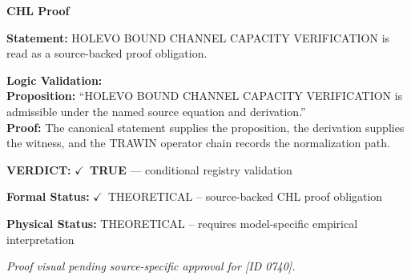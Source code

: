 \vspace{0.45em}
\noindent\textbf{CHL Proof}\par
\textbf{Statement:} HOLEVO BOUND CHANNEL CAPACITY VERIFICATION is read as a source-backed proof obligation.

\textbf{Logic Validation:}\\
\textbf{Proposition:} ``HOLEVO BOUND CHANNEL CAPACITY VERIFICATION is admissible under the named source equation and derivation.''\\
\textbf{Proof:} The canonical statement supplies the proposition, the derivation supplies the witness, and the TRAWIN operator chain records the normalization path.

\textbf{VERDICT:} \ensuremath{\checkmark}\ \textbf{TRUE} --- conditional registry validation

\textbf{Formal Status:} \ensuremath{\checkmark}\ THEORETICAL -- source-backed CHL proof obligation

\textbf{Physical Status:} THEORETICAL -- requires model-specific empirical interpretation
\par\vspace{0.45em}
\par
\vfill
\begingroup\footnotesize\itshape
Proof visual pending source-specific approval for [ID 0740].
\par\endgroup
\vfill
\endgroup
\endgroup
